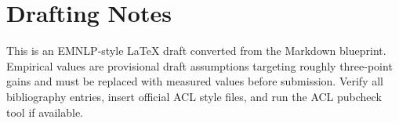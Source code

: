 \documentclass[11pt]{article}
\begin{document}
\section{Drafting Notes}

This is an EMNLP-style LaTeX draft converted from the Markdown blueprint. Empirical values are provisional draft assumptions targeting roughly three-point gains and must be replaced with measured values before submission. Verify all bibliography entries, insert official ACL style files, and run the ACL pubcheck tool if available.
\end{document}
